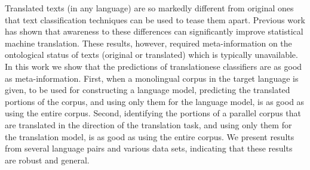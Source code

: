 Translated texts (in any language) are so markedly different from original ones that text classification techniques can be used to tease them apart. Previous work has shown that awareness to these differences can significantly improve statistical machine translation. These results, however, required meta-information on the ontological status of texts (original or translated) which is typically unavailable.  In this work we show that the predictions of translationese classifiers are as good as meta-information.  First, when a monolingual corpus in the target language is given, to be used for constructing a language model, predicting the translated portions of the corpus, and using only them for the language model, is as good as using the entire corpus. Second, identifying the portions of a parallel corpus that are translated in the direction of the translation task, and using only them for the translation model, is as good as using the entire corpus. We present results from several language pairs and various data sets, indicating that these results are robust and general.
